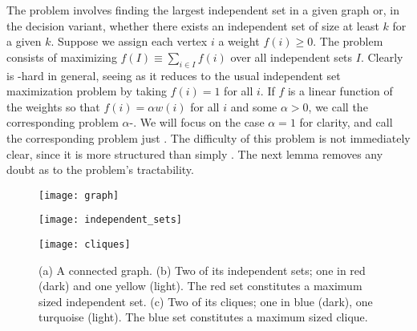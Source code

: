 The \iset problem involves finding the largest independent set in a given  graph or,  in  the decision variant,  whether there exists an independent  set of size at least  $k$ for a given $k$.  
Suppose we assign each vertex $i$ a weight $f(i)\geq 0$. The \mwis problem consists of maximizing $f(I)\equiv \sum_{i\in I}f(i)$ over all independent sets $I$. Clearly \mwis is \NP-hard in general, seeing as it reduces to the usual independent set maximization problem by taking $f(i)=1$ for all $i$. If $f$ is a linear function of the weights so that $f(i)=\alpha w(i)$ for all $i$ and some $\alpha> 0$, we call the corresponding problem $\alpha$-\vwis. We will focus on the case $\alpha=1$ for clarity, and call the  corresponding problem just \vwis. The difficulty of this problem is not immediately clear, since it is more structured than simply \mwis. The next lemma removes any doubt as to the problem's tractability.   

\begin{figure}
	\centering
	\begin{minipage}{0.3\textwidth}
		\centering
		\texttt{[image: graph]}
		\subcaption{}
	\end{minipage}
	\begin{minipage}{0.3\textwidth}
		\centering
		\texttt{[image: independent\_sets]}
		\subcaption{}
	\end{minipage}
	\begin{minipage}{0.3\textwidth}
		\centering
		\texttt{[image: cliques]}
		\subcaption{}
	\end{minipage}
	\caption{(a) A connected  graph. (b) Two of its independent sets; one in red (dark) and one yellow (light). The red set constitutes a maximum sized independent set. (c) Two of its cliques; one in blue (dark), one  turquoise (light). The blue  set constitutes a maximum sized clique.}
	\label{fig:is+cliques}
\end{figure}

